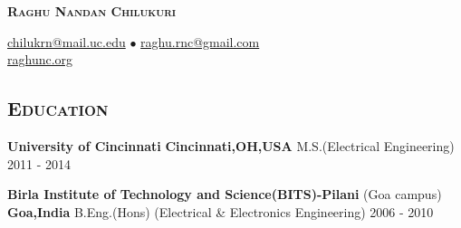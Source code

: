 \documentclass[10pt]{article}
\begin{document}
\begin{center}
 \textbf{ \textsc{\Large Raghu Nandan Chilukuri}}

\href{mailto:chilukrn@mail.uc.edu}{chilukrn@mail.uc.edu} $\bullet$ \href{raghu.rnc@gmail.com}{raghu.rnc@gmail.com}
 \\
\href{http://raghunc.org}{raghunc.org}
\end{center}

			       

\subsection*{\textsc{\large Education}}                 
\textbf{University of Cincinnati} \hfill \textbf{Cincinnati,OH,USA} \newline
M.S.(Electrical Engineering) \hfill 2011 - 2014 \newline
     
\noindent \textbf{Birla Institute of Technology and Science(BITS)-Pilani} (Goa campus) \hfill  \textbf{Goa,India} \newline %
B.Eng.(Hons) (Electrical \& Electronics Engineering) \hfill 2006 - 2010 \newline
\end{document}
